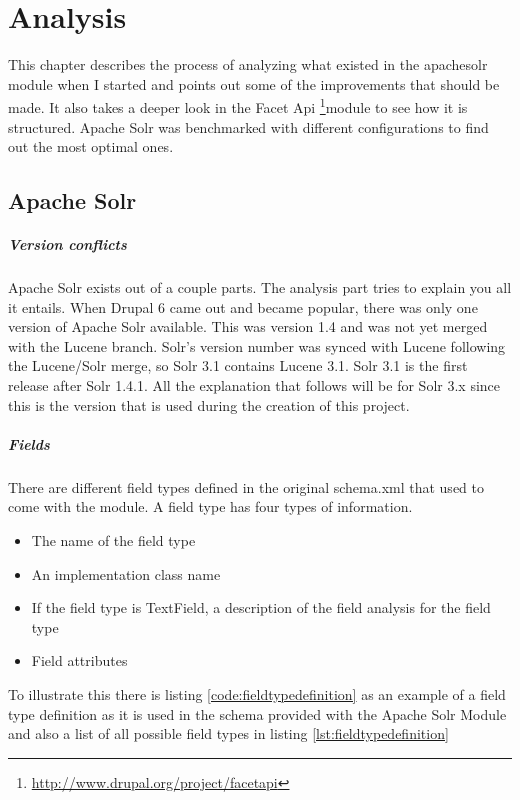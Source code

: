 \chapter{Analysis}
This chapter describes the process of analyzing what existed in the apachesolr module when I started and points out some of the improvements that should be made. It also takes a deeper look in the Facet Api \footnote{\url{http://www.drupal.org/project/facetapi}}module to see how it is structured. 
Apache Solr was benchmarked with different configurations to find out the most optimal ones. 

\section{Apache Solr}
\paragraph{Version conflicts}
Apache Solr exists out of a couple parts. The analysis part tries to explain you all it entails. When Drupal 6 came out and became popular, there was only one version of Apache Solr available. This was version 1.4 and was not yet merged with the Lucene branch. Solr's version number was synced with Lucene following the Lucene/Solr merge, so Solr 3.1 contains Lucene 3.1. Solr 3.1 is the first release after Solr 1.4.1. All the explanation that follows will be for Solr 3.x since this is the version that is used during the creation of this project.

\paragraph{Fields}
There are different field types defined in the original schema.xml that used to come with the module. A field type has four types of information.
\begin{itemize}
  \item The name of the field type
  \item An implementation class name
  \item If the field type is TextField, a description of the field analysis for the field type
  \item Field attributes
\end{itemize}
To illustrate this there is listing \ref{code:fieldtypedefinition} as an example of a field type definition as it is used in the schema provided with the Apache Solr Module and also a list of all possible field types in listing \ref{lst:fieldtypedefinition}

